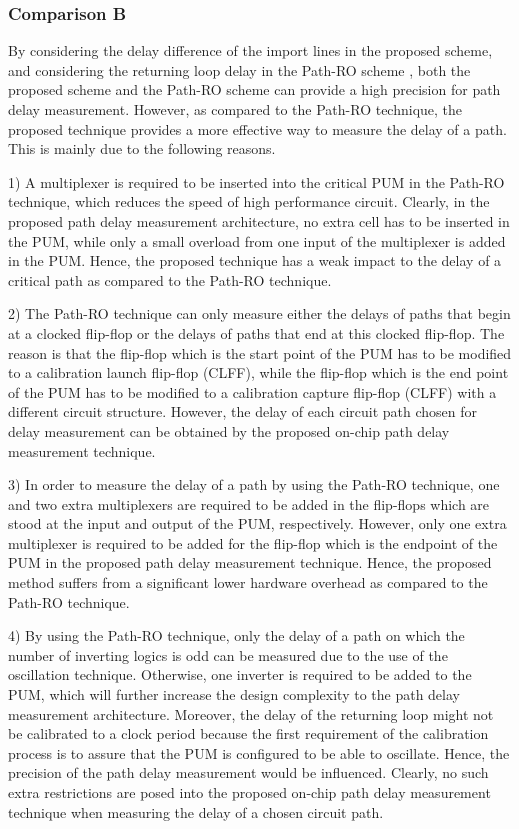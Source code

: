 \subsubsection{Comparison B}
By considering the delay difference of the import lines in the proposed scheme, and considering the returning loop delay in the Path-RO scheme \cite{wang2008path}, both the proposed scheme and the Path-RO scheme can provide a high precision for path delay measurement. However, as compared to the Path-RO technique, the proposed technique provides a more effective way to measure the delay of a path. This is mainly due to the following reasons.

1) A multiplexer is required to be inserted into the critical PUM in the Path-RO technique, which reduces the speed of high performance circuit. Clearly, in the proposed path delay measurement architecture, no extra cell has to be inserted in the PUM, while only a small overload from one input of the multiplexer is added in the PUM. Hence, the proposed technique has a weak impact to the delay of a critical path as compared to the Path-RO technique.

2) The Path-RO technique can only measure either the delays of paths that begin at a clocked flip-flop or the delays of paths that end at this clocked flip-flop. The reason is that the flip-flop which is the start point of the PUM has to be modified to a calibration launch flip-flop (CLFF), while the flip-flop which is the end point of the PUM has to be modified to a calibration capture flip-flop (CLFF) with a different circuit structure. However, the delay of each circuit path chosen for delay measurement can be obtained by the proposed on-chip path delay measurement technique.

3) In order to measure the delay of a path by using the Path-RO technique, one and two extra multiplexers are required to be added in the flip-flops which are stood at the input and output of the PUM, respectively. However, only one extra multiplexer is required to be added for the flip-flop which is the endpoint of the PUM in the proposed path delay measurement technique. Hence, the proposed method suffers from a significant lower hardware overhead as compared to the Path-RO technique.

4) By using the Path-RO technique, only the delay of a path on which the number of inverting logics is odd can be measured due to the use of the oscillation technique. Otherwise, one inverter is required to be added to the PUM, which will further increase the design complexity to the path delay measurement architecture. Moreover, the delay of the returning loop might not be calibrated to a clock period because the first requirement of the calibration process is to assure that the PUM is configured to be able to oscillate. Hence, the precision of the path delay measurement would be influenced. Clearly, no such extra restrictions are posed into the proposed on-chip path delay measurement technique when measuring the delay of a chosen circuit path.

